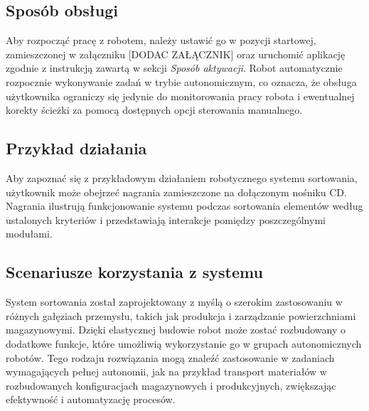 \subsection{Sposób obsługi}
Aby rozpocząć pracę z robotem, należy ustawić go w pozycji startowej, zamieszczonej w załączniku [DODAC ZAŁĄCZNIK] oraz uruchomić aplikację zgodnie z instrukcją zawartą w sekcji \textit{Sposób aktywacji}. Robot automatycznie rozpocznie wykonywanie zadań w trybie autonomicznym, co oznacza, że obsługa użytkownika ograniczy się jedynie do monitorowania pracy robota i ewentualnej korekty ścieżki za pomocą dostępnych opcji sterowania manualnego.

\subsection{Przykład działania}
Aby zapoznać się z przykładowym działaniem robotycznego systemu sortowania, użytkownik może obejrzeć nagrania zamieszczone na dołączonym nośniku CD. Nagrania ilustrują funkcjonowanie systemu podczas sortowania elementów według ustalonych kryteriów i przedstawiają interakcje pomiędzy poszczególnymi modułami.

\subsection{Scenariusze korzystania z systemu}
System sortowania został zaprojektowany z myślą o szerokim zastosowaniu w różnych gałęziach przemysłu, takich jak produkcja i zarządzanie powierzchniami magazynowymi. Dzięki elastycznej budowie robot może zostać rozbudowany o dodatkowe funkcje, które umożliwią wykorzystanie go w grupach autonomicznych robotów. Tego rodzaju rozwiązania mogą znaleźć zastosowanie w zadaniach wymagających pełnej autonomii, jak na przykład transport materiałów w rozbudowanych konfiguracjach magazynowych i produkcyjnych, zwiększając efektywność i automatyzację procesów.





